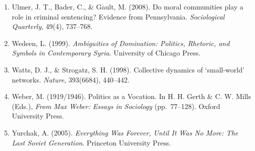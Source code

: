 \documentclass[12pt]{article}
\begin{document}
\begin{enumerate}
  Tilly, C. (1985). War making and state making as organized crime. In P. Evans, D. Rueschemeyer, \& T. Skocpol (Eds.), \emph{Bringing the State Back In} (pp.~169--191). Cambridge University Press.
\item
  Ulmer, J. T., Bader, C., \& Gault, M. (2008). Do moral communities play a role in criminal sentencing? Evidence from Pennsylvania. \emph{Sociological Quarterly}, 49(4), 737--768.
\item
  Wedeen, L. (1999). \emph{Ambiguities of Domination: Politics, Rhetoric, and Symbols in Contemporary Syria}. University of Chicago Press.
\item
  Watts, D. J., \& Strogatz, S. H. (1998). Collective dynamics of `small-world' networks. \emph{Nature}, 393(6684), 440--442.
\item
  Weber, M. (1919/1946). Politics as a Vocation. In H. H. Gerth \& C. W. Mills (Eds.), \emph{From Max Weber: Essays in Sociology} (pp.~77--128). Oxford University Press.
\item
  Yurchak, A. (2005). \emph{Everything Was Forever, Until It Was No More: The Last Soviet Generation}. Princeton University Press.
\end{enumerate}
\end{document}
